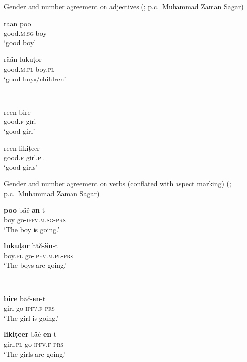 \documentclass[output=collectionpaper]{langsci/langscibook}
\begin{document}
\begin{xlist}
\ex
Gender and number agreement on adjectives (\citealt[19]{Baart1999}; p.c.\ Muhammad Zaman Sagar)\\
\medskip
\begin{minipage}{0.25\textwidth}
\gll raan poo\\
good.\textsc{m.sg} boy\\
\glt`good boy'
\end{minipage}
%
\begin{minipage}{0.5\textwidth}
\gll rään lukuṭor\\
good.\textsc{m.pl} boy.\textsc{pl}\\
\glt `good boys/children'
\end{minipage}
\\
\vspace{3mm}
\begin{minipage}{0.25\textwidth}
\gll reen bire\\
good.\textsc{f} girl\\
\glt `good girl'
\end{minipage}
%
\begin{minipage}{0.25\textwidth}
\gll reen likiṭeer\\
 good.\textsc{f} girl.\textsc{pl}\\
\glt `good girls'
\end{minipage}
\medskip
\ex
Gender and number agreement on verbs (conflated with aspect marking) (\citealt[19]{Baart1999}; p.c.\ Muhammad Zaman Sagar)\\
\medskip
\begin{minipage}{0.4\textwidth}
\gll \textbf{poo} bäč{}-\textbf{an}-t\\
boy go-\textsc{ipfv.m.sg-prs}\\
\glt `The boy is going.'
\end{minipage}
%
\begin{minipage}{0.4\textwidth}
\gll \textbf{lukuṭor} bäč{}-\textbf{än}-t\\
  boy.\textsc{pl} go-\textsc{ipfv.m.pl-prs}\\
\glt   `The boys are going.'
\end{minipage}
\\
\vspace{3mm}
\begin{minipage}{0.4\textwidth}
\gll \textbf{bire} bäč{}-\textbf{en}-t\\
girl go-\textsc{ipfv.f-prs} \\
\glt `The girl is going.'
\end{minipage}
%
\begin{minipage}{0.4\textwidth}
\gll \textbf{likiṭeer} bäč-\textbf{en}-t\\
 girl.\textsc{pl} go-\textsc{ipfv.f-prs}\\
\glt `The girls are going.'
\end{minipage}
%

\end{xlist}
\z
\end{document}
